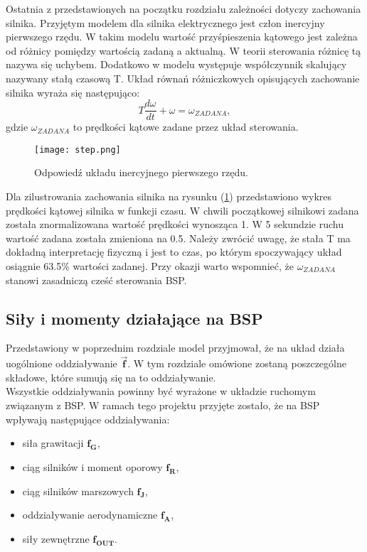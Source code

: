 Ostatnia z przedstawionych na początku rozdziału zależności dotyczy zachowania silnika. Przyjętym modelem dla silnika elektrycznego jest człon inercyjny pierwszego rzędu. W takim modelu wartość przyśpieszenia kątowego jest zależna od różnicy pomiędzy wartością zadaną a aktualną. W teorii sterowania różnicę tą nazywa się uchybem. Dodatkowo w modelu występuje współczynnik skalujący nazywany stałą czasową T. Układ równań różniczkowych opisujących zachowanie silnika wyraża się następująco:
 \[
	T \frac{d\omega}{dt} + \omega = \omega_{ZADANA},
\]
gdzie $\omega_{ZADANA}$ to prędkości kątowe zadane przez układ sterowania. 

\begin{figure}[!h]
   	\centering
      	\texttt{[image: step.png]}
      	\caption{Odpowiedź układu inercyjnego pierwszego rzędu.}
      	\label{rotor_step}
\end{figure}

Dla zilustrowania zachowania silnika na rysunku (\ref{rotor_step}) przedstawiono wykres prędkości kątowej silnika w funkcji czasu. W chwili początkowej silnikowi zadana została znormalizowana wartość prędkości wynosząca 1. W 5 sekundzie ruchu wartość zadana została zmieniona na 0.5. Należy zwrócić uwagę, że stała T ma dokładną interpretację fizyczną i jest to czas, po którym spoczywający układ osiągnie 63.5\% wartości zadanej. Przy okazji warto wspomnieć, że $\omega_{ZADANA}$ stanowi zasadniczą cześć sterowania BSP.

\subsection{Siły i momenty działające na BSP}

Przedstawiony w poprzednim rozdziale model przyjmował, że na układ działa uogólnione oddziaływanie $\bm{\vec{f}}$. W tym rozdziale omówione zostaną poszczególne składowe, które sumują się na to oddziaływanie.\\

Wszystkie oddziaływania powinny być wyrażone w układzie ruchomym związanym z BSP. W ramach tego projektu przyjęte zostało, że na BSP wpływają następujące oddziaływania:
\begin{itemize}
  \item {
    siła grawitacji  $\bm{f_G}$,
  }
  \item{   
    ciąg silników i moment oporowy  $\bm{f_R}$,
   }
    \item{   
    ciąg silników marszowych  $\bm{f_J}$,
   }
    \item{   
    oddziaływanie aerodynamiczne $\bm{f_A}$,
   }
    \item{   
   siły zewnętrzne $\bm{f_{OUT}}$.
   }
\end{itemize}


